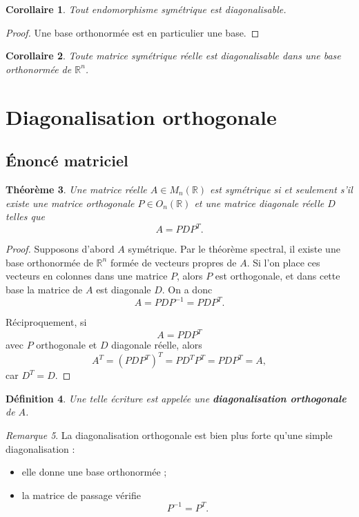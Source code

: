 \documentclass[11pt,a4paper]{article}
\newtheorem{definition}{Définition}[section]
\newtheorem{theoreme}[definition]{Théorème}
\newtheorem{corollaire}[definition]{Corollaire}
\theoremstyle{remark}
\newtheorem{remarque}[definition]{Remarque}
\newcommand{\R}{\mathbb{R}}
\begin{document}
\begin{corollaire}
Tout endomorphisme symétrique est diagonalisable.
\end{corollaire}

\begin{proof}
Une base orthonormée est en particulier une base.
\end{proof}

\begin{corollaire}
Toute matrice symétrique réelle est diagonalisable dans une base orthonormée de \(\R^n\).
\end{corollaire}

\section{Diagonalisation orthogonale}

\subsection{Énoncé matriciel}

\begin{theoreme}
Une matrice réelle \(A\in M_n(\R)\) est symétrique si et seulement s’il existe une matrice orthogonale \(P\in O_n(\R)\) et une matrice diagonale réelle \(D\) telles que
\[
A=PDP^T.
\]
\end{theoreme}

\begin{proof}
Supposons d’abord \(A\) symétrique. Par le théorème spectral, il existe une base orthonormée de \(\R^n\) formée de vecteurs propres de \(A\). Si l’on place ces vecteurs en colonnes dans une matrice \(P\), alors \(P\) est orthogonale, et dans cette base la matrice de \(A\) est diagonale \(D\). On a donc
\[
A=PDP^{-1}=PDP^T.
\]

Réciproquement, si
\[
A=PDP^T
\]
avec \(P\) orthogonale et \(D\) diagonale réelle, alors
\[
A^T=(PDP^T)^T=P D^T P^T=PDP^T=A,
\]
car \(D^T=D\).
\end{proof}

\begin{definition}
Une telle écriture est appelée une \textbf{diagonalisation orthogonale} de \(A\).
\end{definition}

\begin{remarque}
La diagonalisation orthogonale est bien plus forte qu’une simple diagonalisation :
\begin{itemize}
    \item elle donne une base orthonormée ;
    \item la matrice de passage vérifie
    \[
    P^{-1}=P^T.
    \]
\end{itemize}
\end{remarque}
\end{document}
